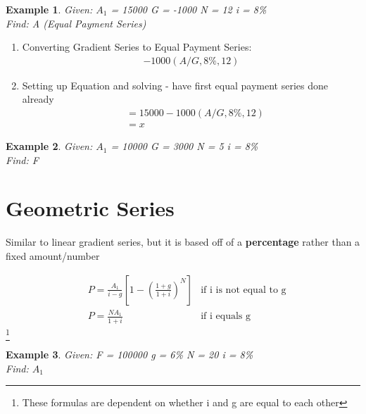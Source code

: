 \documentclass{report} %
\newtheorem{exmp}{Example}
\begin{document}
\begin{exmp}
    Given: \quad $A_1$ = 15000 \quad G = -1000 \quad N = 12 \quad i = 8\% \\
    Find: \quad A (Equal Payment Series)
\end{exmp}
\begin{enumerate}
    \item Converting Gradient Series to Equal Payment Series:
    \begin{equation*}
        \begin{aligned}
            -1000(A/G,8\%,12)
        \end{aligned}
    \end{equation*}
    \item Setting up Equation and solving - have first equal payment series done already
    \begin{equation*}
        \begin{aligned}
             &= 15000 -1000(A/G,8\%,12) \\
             &= x %
        \end{aligned}
    \end{equation*}
\end{enumerate}

\begin{exmp}
    Given: \quad $A_1$ = 10000 \quad G = 3000 \quad N = 5 \quad i = 8\% \\
    Find: \quad F %
\end{exmp}

\newpage
\section*{Geometric Series}
Similar to linear gradient series, but it is based off of a \textbf{percentage} rather than a fixed amount/number

\begin{equation*}
    \begin{aligned}
        &P = \frac{A_1}{i-g}\left[1-\left(\frac{1+g}{1+i}\right) ^N \right] &\text{if i is not equal to g} \\
        &P = \frac{NA_1}{1+i} &\text{if i equals g}
    \end{aligned}
\end{equation*}
\footnote{These formulas are dependent on whether i and g are equal to each other}

\begin{exmp}
    Given: \quad F = 100000 \quad g = 6\% \quad N = 20 \quad i = 8\% \\
    Find: \quad $A_1$
\end{exmp}
\end{document}

